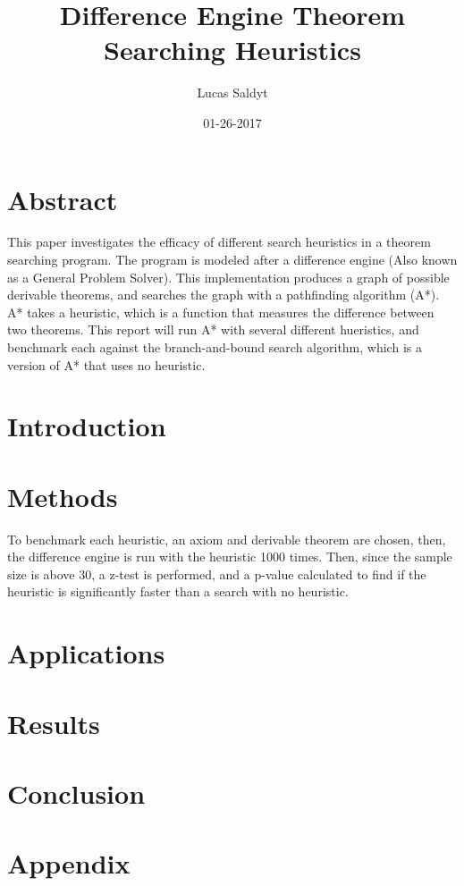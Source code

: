 \documentclass{article}
\title{Difference Engine Theorem Searching Heuristics}
\date{01-26-2017}
\author{Lucas Saldyt}
\begin{document}
\maketitle
{}
\newpage
{}

\section{Abstract}

    This paper investigates the efficacy of different search heuristics in a theorem searching program. 
The program is modeled after a difference engine (Also known as a General Problem Solver).
This implementation produces a graph of possible derivable theorems, and searches the graph with a pathfinding algorithm (A*). 
A* takes a heuristic, which is a function that measures the difference between two theorems.
This report will run A* with several different hueristics, and benchmark each against the branch-and-bound search algorithm, which is a version of A* that uses no heuristic. 

\section{Introduction}

\section{Methods}

To benchmark each heuristic, an axiom and derivable theorem are chosen, then, the difference engine is run with the heuristic 1000 times. 
Then, since the sample size is above 30, a z-test is performed, and a p-value calculated to find if the heuristic is significantly faster than a search with no heuristic.

\section{Applications}
\section{Results}
\section{Conclusion}
\section{Appendix}
\end{document}

